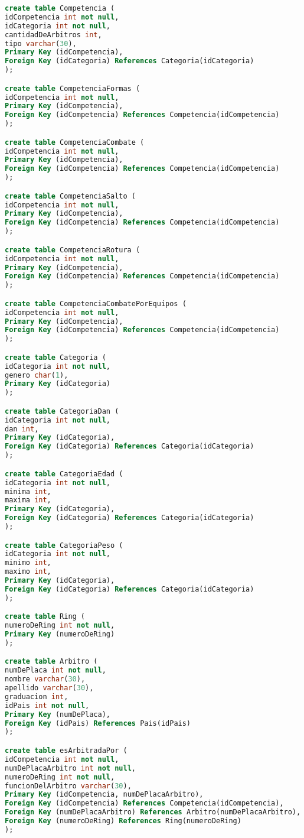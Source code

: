 \documentclass[hidelinks,a4paper,11pt, nofootinbib]{article}
\begin{document}
\begin{lstlisting}[language=SQL]
create table Competencia (
idCompetencia int not null,
idCategoria int not null,
cantidadDeArbitros int,
tipo varchar(30),
Primary Key (idCompetencia),
Foreign Key (idCategoria) References Categoria(idCategoria)
);

create table CompetenciaFormas (
idCompetencia int not null,
Primary Key (idCompetencia),
Foreign Key (idCompetencia) References Competencia(idCompetencia)
);

create table CompetenciaCombate (
idCompetencia int not null,
Primary Key (idCompetencia),
Foreign Key (idCompetencia) References Competencia(idCompetencia)
);

create table CompetenciaSalto (
idCompetencia int not null,
Primary Key (idCompetencia),
Foreign Key (idCompetencia) References Competencia(idCompetencia)
);

create table CompetenciaRotura (
idCompetencia int not null,
Primary Key (idCompetencia),
Foreign Key (idCompetencia) References Competencia(idCompetencia)
);

create table CompetenciaCombatePorEquipos (
idCompetencia int not null,
Primary Key (idCompetencia),
Foreign Key (idCompetencia) References Competencia(idCompetencia)
);

create table Categoria (
idCategoria int not null,
genero char(1),
Primary Key (idCategoria)
);

create table CategoriaDan (
idCategoria int not null,
dan int,
Primary Key (idCategoria),
Foreign Key (idCategoria) References Categoria(idCategoria)
);

create table CategoriaEdad (
idCategoria int not null,
minima int,
maxima int,
Primary Key (idCategoria),
Foreign Key (idCategoria) References Categoria(idCategoria)
);

create table CategoriaPeso (
idCategoria int not null,
minimo int,
maximo int,
Primary Key (idCategoria),
Foreign Key (idCategoria) References Categoria(idCategoria)
);

create table Ring (
numeroDeRing int not null,
Primary Key (numeroDeRing)
);

create table Arbitro (
numDePlaca int not null,
nombre varchar(30),
apellido varchar(30),
graduacion int,
idPais int not null,
Primary Key (numDePlaca),
Foreign Key (idPais) References Pais(idPais)
);

create table esArbitradaPor (
idCompetencia int not null,
numDePlacaArbitro int not null,
numeroDeRing int not null,
funcionDelArbitro varchar(30),
Primary Key (idCompetencia, numDePlacaArbitro),
Foreign Key (idCompetencia) References Competencia(idCompetencia),
Foreign Key (numDePlacaArbitro) References Arbitro(numDePlacaArbitro),
Foreign Key (numeroDeRing) References Ring(numeroDeRing)
);
\end{lstlisting}
\end{document}
